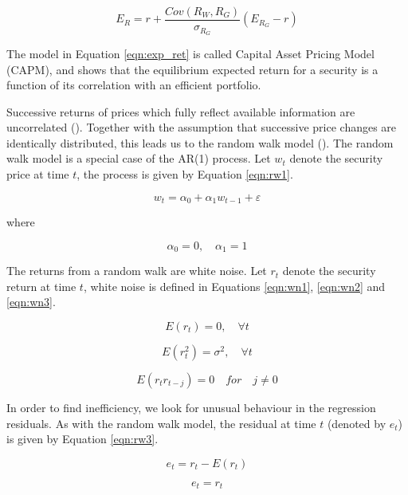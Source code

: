 \documentclass[cic,tc, english]{iiufrgs}
\begin{document}
    \begin{equation}
        \label{eqn:exp_ret}
        E_R = r + \frac{Cov(R_W, R_G)}{\sigma_{R_G}} (E_{R_G} - r)
    \end{equation}

    The model in Equation \ref{eqn:exp_ret} is called Capital Asset Pricing Model (CAPM), and shows that the equilibrium expected return for a security is a function of its correlation with an efficient portfolio.
    
    Successive returns of prices which fully reflect available information are uncorrelated (\citet{samuelson1965}). Together with the assumption that successive price changes are identically distributed, this leads us to the random walk model (\citet{fama1970}). The random walk model is a special case of the AR(1) process. Let $w_t$ denote the security price at time $t$, the process is given by Equation \ref{eqn:rw1}.
    
    \begin{equation}
        \label{eqn:rw1}
        w_t = \alpha_0 + \alpha_1 w_{t-1} + \varepsilon
    \end{equation}

    where

    $$\alpha_0 = 0, \quad \alpha_1 = 1$$

    The returns from a random walk are white noise. Let $r_{t}$ denote the security return at time $t$, white noise is defined in Equations \ref{eqn:wn1}, \ref{eqn:wn2} and \ref{eqn:wn3}.
    
    \begin{equation}
        \label{eqn:wn1}
        E(r_t) = 0, \quad \forall t
    \end{equation}
    
    \begin{equation}
        \label{eqn:wn2}
        E(r_t^2) = \sigma^2, \quad \forall t
    \end{equation}
    
    \begin{equation}
        \label{eqn:wn3}
        E(r_tr_{t-j}) = 0 \quad for \quad j \neq 0
    \end{equation}

    In order to find inefficiency, we look for unusual behaviour in the regression residuals. As with the random walk model, the residual at time $t$ (denoted by $e_t$) is given by Equation \ref{eqn:rw3}.

    $$e_t = r_t - E(r_t)$$

    \begin{equation}
        \label{eqn:rw3}
        e_t = r_t
    \end{equation}
\end{document}
